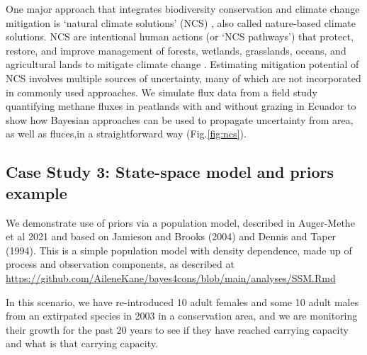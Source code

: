 \documentclass{article}
\begin{document}
\par One major approach that integrates biodiversity conservation and climate change mitigation is `natural climate solutions' (NCS) \citep{ellis2024principles}, also called nature-based climate solutions. NCS are intentional human actions (or `NCS pathways') that protect, restore, and improve management of forests, wetlands, grasslands, oceans, and agricultural lands to mitigate climate change \citep{griscom2017natural}. Estimating mitigation potential of NCS involves multiple sources of uncertainty, many of which are not incorporated in commonly used approaches. We simulate flux data from a field study quantifying methane fluxes in peatlands with and without grazing in Ecuador \citep{sanchez2017carbon} to show how Bayesian approaches can be used to propagate uncertainty from area, as well as fluces,in a straightforward way (Fig.\ref{fig:ncs}). 

\subsection*{Case Study 3: State-space model and priors example}
\par We demonstrate use of priors via a population model, described in Auger-Methe et al 2021 and based on Jamieson and Brooks (2004) and Dennis and Taper (1994). This is a simple population model with density dependence, made up of process and observation components, as described at \href{https://github.com/AileneKane/bayes4cons/blob/main/analyses/SSM.Rmd}{https://github.com/AileneKane/bayes4cons/blob/main/analyses/SSM.Rmd}

\par In this scenario, we have re-introduced 10 adult females and some 10 adult males from an extirpated species in 2003 in a conservation area, and we are monitoring their growth for the past 20 years to see if they have reached carrying capacity and what is that carrying capacity.
\end{document}
